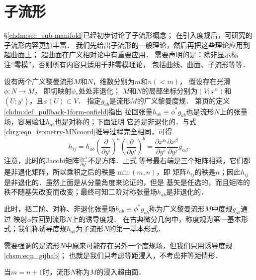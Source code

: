 
\chapter{子流形}\label{chsm}
\S \ref{chdm:sec_sub-manifold}已经初步讨论了子流形概念；
在引入度规后，可研究的子流形内容更加丰富．
我们先给出子流形的一般理论，然后再把这些理论应用到超曲面上；
超曲面在广义相对论中有重要应用．
需要声明的是：除非显示标注“零模”，否则所有内容只适用于非零模理论，
包括曲线、曲面、子流形等等．


设有两个广义黎曼流形$M$和$N$，维数分别为$m$和$n(<m)$，
假设存在光滑$\phi:N\to M$，%
即切映射$\phi_{*}$处处非退化；
$M$和$N$的局部坐标分别为$(V;x^\alpha)$和$(U;y^i)$，且$\phi(U)\subset V$．
指定$g_{ab}$是流形$M$的广义黎曼度规．
第\pageref{chdm:def_pullback-1form-onfield}页的定义\ref{chdm:def_pullback-1form-onfield}指出
拉回张量$h_{ab}\equiv\phi^{*}g_{ab}$也是流形$N$上的张量场，容易验证$h_{ab}$也是对称的；下面证明
它还是非退化的．与式\eqref{chrg:eqn_isometry-MNcoord}推导过程完全相同，可得
\begin{equation}\label{chsm:eqn_gijhab}
    h_{ij}= h_{ab} \left(\frac{\partial }{\partial y^i}\right)^a
    \left(\frac{\partial }{\partial y^j}\right)^b = \frac{\partial x^\alpha}{\partial y^i}
    \frac{\partial x^\beta}{\partial y^j} g_{\alpha\beta} .
\end{equation}
注意，此时的Jacobi矩阵$\frac{\partial x^\alpha}{\partial y^i}$不是方阵．上式
等号最右端是三个矩阵相乘，它们都是非退化矩阵，所以乘积之后的秩是$\min(m,n)$，即
矩阵$h_{ij}$的秩是$n$；因此$h_{ij}$是非退化的．虽然上面是从分量角度来论证的，但是
基矢是任选的，而且矩阵的秩不随基矢改变而改变；最终可知二阶对称张量场$h_{ab}$是非退化的．

此时，把二阶、对称、非退化张量场$h_{ab}\equiv\phi^{*}g_{ab}$称为广义黎曼流形$M$中度规$g_{ab}$通过
映射$\phi$拉回到流形$N$上的{\heiti 诱导度规}．
在古典微分几何中，称度规为第一基本形式；我们称诱导度规$h_{ab}$为子流形$N$的{\heiti 第一基本形式}．

需要强调的是流形$N$中原来可能存在另外一个度规场，但我们只用诱导度规\eqref{chsm:eqn_gijhab}；
也就是我们只考虑等距浸入，不考虑非等距情形．

当$m=n+1$时，流形$N$称为$M$的浸入超曲面．




